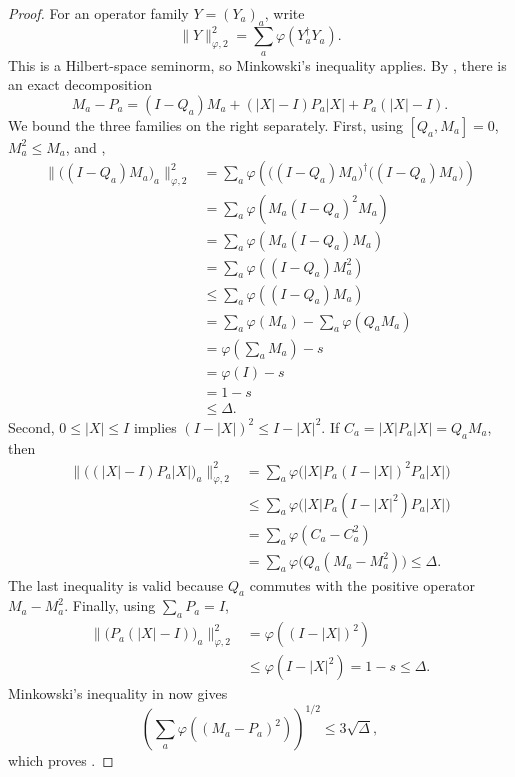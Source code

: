 \documentclass[11pt]{article}
\theoremstyle{definition}
\newcommand{\abs}[1]{\lvert #1 \rvert}
\begin{document}
\begin{proof}
For an operator family $Y=(Y_a)_a$, write
\begin{equation*}
 \|Y\|_{\varphi,2}^2=\sum_a\varphi(Y_a^\dagger Y_a).
\end{equation*}
This is a Hilbert-space seminorm, so Minkowski's inequality applies.
By , there is an exact decomposition
\begin{equation}\label{eq:orthogonalization-decomposition}
 M_a-P_a
 =(I-Q_a)M_a+(\abs{X}-I)P_a\abs{X}+P_a(\abs{X}-I).
\end{equation}
We bound the three families on the right separately.  First, using
$[Q_a,M_a]=0$, $M_a^2\leq M_a$, and
,
\begin{align*}
 \big\|\big((I-Q_a)M_a\big)_a\big\|_{\varphi,2}^2
 &=\sum_a
 \varphi\left(
 \big((I-Q_a)M_a\big)^\dagger
 \big((I-Q_a)M_a\big)
 \right)\\
 &=\sum_a
 \varphi\left(
 M_a(I-Q_a)^2M_a
 \right)\\
 &=\sum_a
 \varphi\left(
 M_a(I-Q_a)M_a
 \right)\\
 &=\sum_a
 \varphi\left(
 (I-Q_a)M_a^2
 \right)\\
 &\leq\sum_a
 \varphi\left(
 (I-Q_a)M_a
 \right)\\
 &=\sum_a\varphi(M_a)
 -\sum_a\varphi(Q_aM_a)\\
 &=\varphi\left(\sum_aM_a\right)-s\\
 &=\varphi(I)-s\\
 &=1-s\\
 &\leq\Delta.
\end{align*}
Second, $0\leq\abs{X}\leq I$ implies $(I-\abs{X})^2\leq I-\abs{X}^2$.  If
$C_a=\abs{X}P_a\abs{X}=Q_aM_a$, then
\begin{align*}
 \big\|\big((\abs{X}-I)P_a\abs{X}\big)_a\big\|_{\varphi,2}^2
 &=\sum_a\varphi\bigl(\abs{X}P_a(I-\abs{X})^2P_a\abs{X}\bigr)\\
 &\leq\sum_a\varphi\bigl(\abs{X}P_a(I-\abs{X}^2)P_a\abs{X}\bigr)\\
 &=\sum_a\varphi(C_a-C_a^2)\\
 &=\sum_a\varphi\bigl(Q_a(M_a-M_a^2)\bigr)\leq\Delta.
\end{align*}
The last inequality is valid because $Q_a$ commutes with the positive
operator $M_a-M_a^2$.  Finally, using $\sum_aP_a=I$,
\begin{align*}
 \big\|\big(P_a(\abs{X}-I)\big)_a\big\|_{\varphi,2}^2
 &=\varphi((I-\abs{X})^2)\\
 &\leq\varphi(I-\abs{X}^2)=1-s\leq\Delta.
\end{align*}
Minkowski's inequality in 
now gives
\begin{equation*}
 \left(\sum_a\varphi((M_a-P_a)^2)\right)^{1/2}
 \leq3\sqrt\Delta,
\end{equation*}
which proves .
\end{proof}
\end{document}
